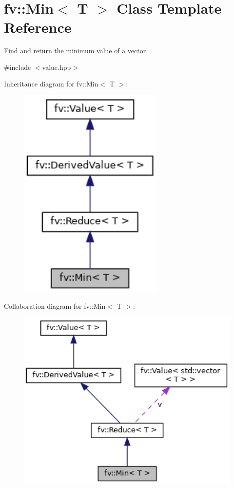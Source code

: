 \hypertarget{classfv_1_1Min}{}\section{fv\+:\+:Min$<$ T $>$ Class Template Reference}
\label{classfv_1_1Min}


Find and return the minimum value of a vector.  




{\ttfamily \#include $<$value.\+hpp$>$}



Inheritance diagram for fv\+:\+:Min$<$ T $>$\+:
\nopagebreak
\begin{figure}[H]
\begin{center}
\leavevmode
\includegraphics[width=205pt]{classfv_1_1Min__inherit__graph}
\end{center}
\end{figure}


Collaboration diagram for fv\+:\+:Min$<$ T $>$\+:
\nopagebreak
\begin{figure}[H]
\begin{center}
\leavevmode
\includegraphics[width=350pt]{classfv_1_1Min__coll__graph}
\end{center}
\end{figure}
